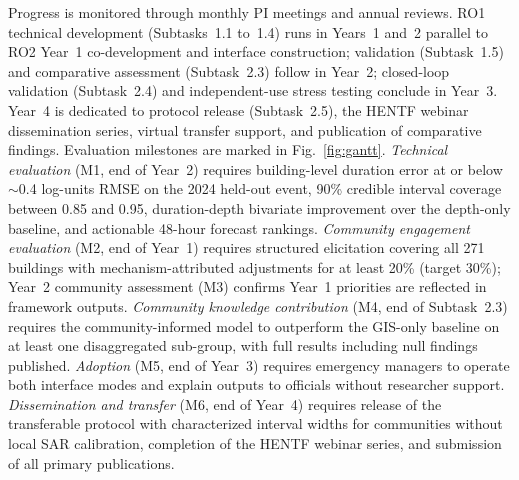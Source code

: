 \documentclass[11pt]{article}
\begin{document}
Progress is monitored through monthly PI meetings and annual reviews. RO1
technical development (Subtasks~1.1 to~1.4) runs in Years~1 and~2 parallel to
RO2 Year~1 co-development and interface construction; validation (Subtask~1.5)
and comparative assessment (Subtask~2.3) follow in Year~2; closed-loop
validation (Subtask~2.4) and independent-use stress testing conclude in Year~3.
Year~4 is dedicated to protocol release (Subtask~2.5), the HENTF webinar dissemination series, virtual transfer support, and publication of comparative findings.
Evaluation milestones are marked in Fig.~\ref{fig:gantt}.
\textit{Technical evaluation} (M1, end of Year~2) requires building-level duration error at or below $\sim$0.4 log-units RMSE on the 2024 held-out event, 90\% credible interval coverage between 0.85 and 0.95, duration-depth bivariate improvement over the depth-only baseline, and actionable 48-hour forecast rankings.
\textit{Community engagement evaluation} (M2, end of Year~1) requires structured elicitation covering all 271 buildings with mechanism-attributed adjustments for at least 20\% (target 30\%); Year~2 community assessment (M3) confirms Year~1 priorities are reflected in framework outputs.
\textit{Community knowledge contribution} (M4, end of Subtask~2.3) requires the community-informed model to outperform the GIS-only baseline on at least one disaggregated sub-group, with full results including null findings published.
\textit{Adoption} (M5, end of Year~3) requires emergency managers to operate both interface modes and explain outputs to officials without researcher support.
\textit{Dissemination and transfer} (M6, end of Year~4) requires release of the transferable protocol with characterized interval widths for communities without local SAR calibration, completion of the HENTF webinar series, and submission of all primary publications.
\end{document}
